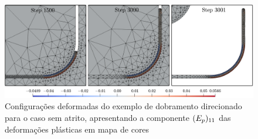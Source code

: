 \documentclass[Tese.tex]{subfiles}
\begin{document}
\begin{figure}[!htb]
	\centering
	\caption{Configurações deformadas do exemplo de dobramento direcionado para o caso sem atrito, apresentando a componente $({E}_p)_{11}$ das deformações plásticas em mapa de cores}
	\label{fig:drawBendingResults}
	\includegraphics[scale=0.45]{Figuras/ExemplosContato/drawBendingResults.png}
\end{figure}
\end{document}
